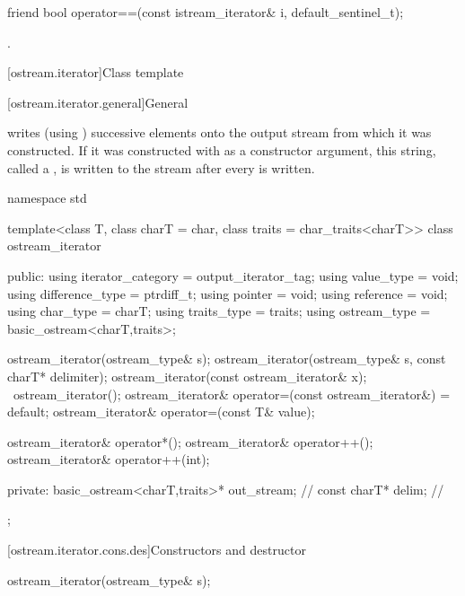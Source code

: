 %
\begin{itemdecl}
friend bool operator==(const istream_iterator& i, default_sentinel_t);
\end{itemdecl}

\begin{itemdescr}
\pnum
\returns
{}.
\end{itemdescr}

[ostream.iterator]{Class template }

[ostream.iterator.general]{General}

\pnum
{}%
writes (using
)
successive elements onto the output stream from which it was constructed.
If it was constructed with
as a constructor argument, this string, called a
,
is written to the stream after every
is written.

\begin{codeblock}
namespace std {
  template<class T, class charT = char, class traits = char_traits<charT>>
  class ostream_iterator {
  public:
    using iterator_category = output_iterator_tag;
    using value_type        = void;
    using difference_type   = ptrdiff_t;
    using pointer           = void;
    using reference         = void;
    using char_type         = charT;
    using traits_type       = traits;
    using ostream_type      = basic_ostream<charT,traits>;

    ostream_iterator(ostream_type& s);
    ostream_iterator(ostream_type& s, const charT* delimiter);
    ostream_iterator(const ostream_iterator& x);
    ~ostream_iterator();
    ostream_iterator& operator=(const ostream_iterator&) = default;
    ostream_iterator& operator=(const T& value);

    ostream_iterator& operator*();
    ostream_iterator& operator++();
    ostream_iterator& operator++(int);

  private:
    basic_ostream<charT,traits>* out_stream;            // \expos
    const charT* delim;                                 // \expos
  };
}
\end{codeblock}

[ostream.iterator.cons.des]{Constructors and destructor}

%
\begin{itemdecl}
ostream_iterator(ostream_type& s);
\end{itemdecl}

